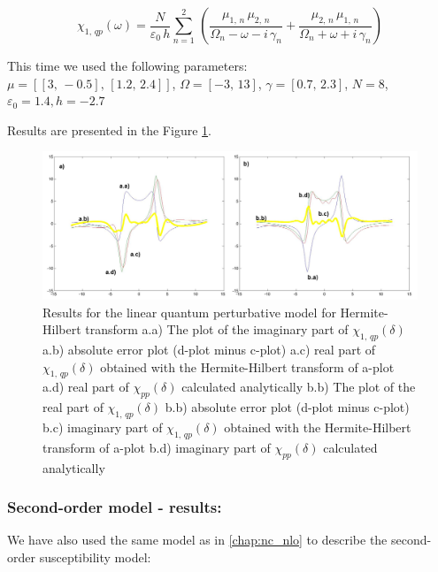 \documentclass[12pt,twoside,a4paper]{article}
\numberwithin{equation}{subsection}
\numberwithin{figure}{subsection}
\begin{document}
\begin{equation} \label{eq:hht_qp}
  {\chi_{1, \,qp}}(\omega ) = \frac {N}{\varepsilon_0\,h} \sum_{n=1}^{2}\,(\frac {{\mu_{1, \,n}}\,{ \mu_{2, \,n}}}{{\Omega_{n}}
  - \omega  - i\,{\gamma_{n}}} + \frac {{\mu_{2, \,n}}\,{\mu_{1, \,n}}}{{\Omega_{n}} + \omega + i\,{\gamma_{n}}})
\end{equation}

This time we used the following parameters: \\
$\mu = [[3, \, - 0.5], \,[1.2, \,2.4]]$, 
$\Omega =[ - 3, \,13]$, 
$\gamma =[0.7, \,2.3]$,  
$N=8$, 
${\varepsilon_{0}}=1.4, 
h= - 2.7$

Results are presented in the Figure \ref{fig:hht_qp1}. 

\begin{figure}
  \includegraphics[width=150mm]{img/hht_qp1.png}
  \caption{Results for the linear quantum perturbative model for Hermite-Hilbert transform
    a.a) The plot of the imaginary part of ${\chi_{1, \,qp}}(\delta )$
    a.b) absolute error plot (d-plot minus c-plot) 
    a.c) real part of ${\chi_{1, \,qp}}(\delta )$ obtained with the Hermite-Hilbert transform of a-plot 
    a.d) real part of ${\chi_{pp}}(\delta )$ calculated analytically 
    b.b) The plot of the real part of ${\chi_{1, \,qp}}(\delta )$ 
    b.b) absolute error plot (d-plot minus c-plot) 
    b.c) imaginary part of ${\chi_{1, \,qp}}(\delta )$ obtained with the Hermite-Hilbert transform of a-plot 
    b.d) imaginary part of ${\chi_{pp}}(\delta )$ calculated analytically  
    \label{fig:hht_qp1}
  }
\end{figure}

\subsubsection*{Second-order model - results:}

We have also used the same model as in \ref{chap:nc_nlo} to describe the second-order susceptibility model:
\end{document}
